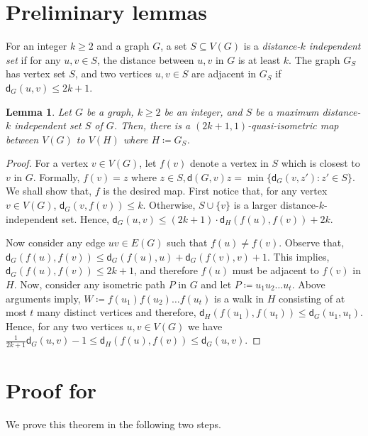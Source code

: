 \documentclass[a4paper]{article}
\newcommand{\dist}[2]{\mathsf{d}\left(#1,#2\right)}
\newcommand{\distG}[3]{\mathsf{d}_{#1}\left(#2,#3\right)}
\newtheorem{lemma}{Lemma}
\begin{document}
\newpage

\section{Preliminary lemmas}

\newcommand{\IndGraph}[2]{{#1}_{#2}}
For an integer $k\geq 2$ and a graph $G$, a set $S\subseteq V(G)$ is a \emph{distance-$k$ independent set} if for any $u,v\in S$, the distance between $u,v$ in $G$ is at least $k$. The graph $\IndGraph{G}{S}$ has vertex set $S$, and two vertices $u,v\in S$ are adjacent in $\IndGraph{G}{S}$ if $\distG{G}{u}{v}\leq 2k+1$. 

\begin{lemma}
Let $G$ be a graph, $k\geq 2$ be an integer, and $S$ be a maximum distance-$k$ independent set $S$ of $G$. Then, there is a $(2k+1,1)$-quasi-isometric map between $V(G)$ to $V(H)$ where $H\coloneqq \IndGraph{G}{S}$.
\end{lemma}
\begin{proof}
	For a vertex $v\in V(G)$, let $f(v)$ denote a vertex in $S$ which is closest to $v$ in $G$. Formally, $f(v)=z$ where $z\in S, \dist{G}{v}{z}=\min\{\distG{G}{v}{z'}\colon z'\in S\}$. We shall show that, $f$ is the desired map. First notice that, for any vertex $v\in V(G)$, $\distG{G}{v}{f(v)} \leq k$. Otherwise, $S\cup \{v\}$ is a larger distance-$k$-independent set. Hence, $\distG{G}{u}{v}\leq (2k+1)\cdot \distG{H}{f(u)}{f(v)} + 2k$. 
	
	Now consider any edge $uv\in E(G)$ such that $f(u)\not= f(v)$. Observe that, $\distG{G}{f(u)}{f(v)}\leq \distG{G}{f(u)}{u} + \distG{G}{f(v)}{v} + 1$. This implies, $\distG{G}{f(u)}{f(v)}\leq 2k+1$, and therefore $f(u)$ must be adjacent to $f(v)$ in $H$. 
	Now, consider any isometric path $P$ in $G$  and let $P\coloneqq u_1u_2\ldots u_t$. Above arguments imply, $W\coloneqq f(u_1)f(u_2)\ldots f(u_t)$ is a walk in $H$ consisting of at most $t$ many distinct vertices and therefore, $\distG{H}{f(u_1)}{f(u_t)}\leq \distG{G}{u_1}{u_t}$. Hence, for any two vertices $u,v\in V(G)$ we have $\frac{1}{2k+1}\distG{G}{u}{v}-1 \leq \distG{H}{f(u)}{f(v)} \leq \distG{G}{u}{v}$.
\end{proof}


\section{Proof for }

We prove this theorem in the following two steps. 
\end{document}
